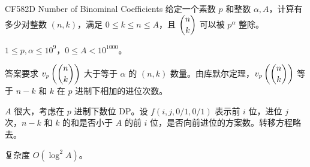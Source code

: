 \documentclass[../main.tex]{subfiles}
\begin{document}
\begin{frame}{CF582D Number of Binominal Coefficients}
给定一个素数 $p$ 和整数 $\alpha,A$，计算有多少对整数 $(n,k)$，满足 $0\le k\le n\le A$，且 $\dbinom{n}{k}$ 可以被 $p^{\alpha}$ 整除。

$1\le p,\alpha\le 10^9$，$0\le A<10^{1000}$。
\end{frame}

\begin{frame}
答案要求 $v_p\left(\dbinom{n}{k} \right)$ 大于等于 $\alpha$ 的 $(n,k)$ 数量。由库默尔定理，$v_p\left(\dbinom{n}{k}\right)$ 等于 $n-k$ 和 $k$ 在 $p$ 进制下相加的进位次数。\pause

$A$ 很大，考虑在 $p$ 进制下数位 DP。设 $f(i,j,0/1,0/1)$ 表示前 $i$ 位，进位 $j$ 次，$n-k$ 和 $k$ 的和是否小于 $A$ 的前 $i$ 位，是否向前进位的方案数。转移方程略去。

复杂度 $O(\log^2 A)$。
\end{frame}
\end{document}
